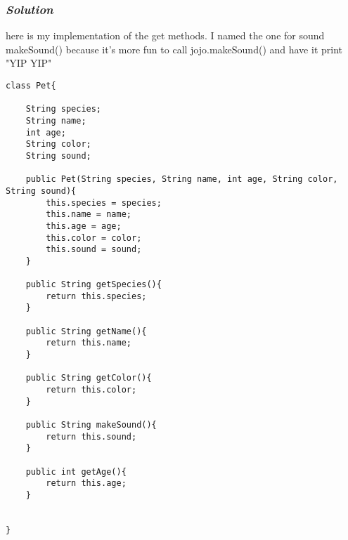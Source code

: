 \documentclass[14pt]{extreport}%
\begin{document}
\subsubsection{\textit{Solution}}
here is my implementation of the get methods. I named the one for sound makeSound() because it's more fun to call jojo.makeSound() and have it print "YIP YIP"
\begin{lstlisting}
class Pet{

    String species;
    String name;
    int age;
    String color;
    String sound;

    public Pet(String species, String name, int age, String color, String sound){
        this.species = species;
        this.name = name;
        this.age = age;
        this.color = color;
        this.sound = sound;
    }

    public String getSpecies(){
        return this.species;
    }

    public String getName(){
        return this.name;
    }

    public String getColor(){
        return this.color;
    }

    public String makeSound(){
        return this.sound;
    }

    public int getAge(){
        return this.age;
    }


}
\end{lstlisting}{}
\end{document}
